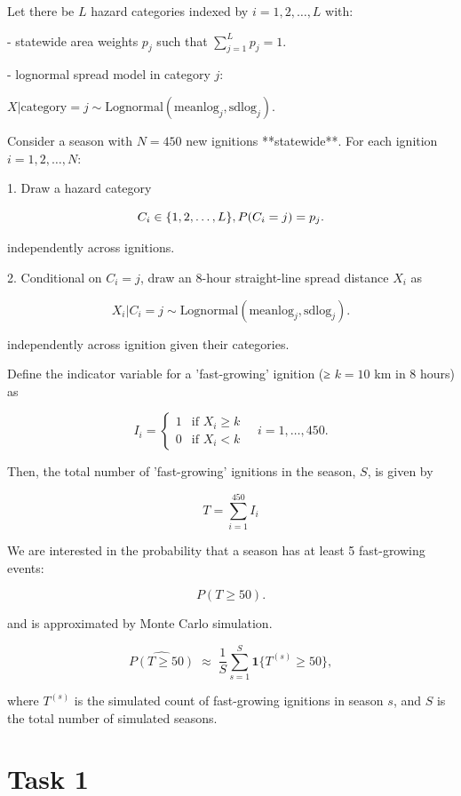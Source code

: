\documentclass[
  12pt,
]{scrreprt}
\begin{document}
\begin{customtextbox}

Let there be $L$ hazard categories indexed by $i = 1, 2, \ldots, L$ with:

- statewide area weights $p_j$ such that $\sum_{j=1}^{L} p_j = 1$.

- lognormal spread model in category $j$: 

$ X | \text{category} = j \sim \text{Lognormal}(\text{meanlog}_j, \text{sdlog}_j). $

Consider a season with $N = 450$ new ignitions **statewide**. For each ignition $i = 1, 2, \ldots, N$:

1. Draw a hazard category 

$$ C_i \in \{1, 2, \ldots, L\}, \space \space P(C_i = j) = p_j. $$

independently across ignitions.

2. Conditional on $C_i = j$, draw an 8-hour straight-line spread distance $X_i$ as

$$ X_i | C_i = j \sim \text{Lognormal}(\text{meanlog}_j, \text{sdlog}_j). $$

independently across ignition given their categories.

Define the indicator variable for a 'fast-growing' ignition (≥ $k = 10$ km in 8 hours) as

$$ I_i = \begin{cases} 1 & \text{if } X_i \geq k \\ 0 & \text{if } X_i < k \end{cases} \quad i = 1,\dots,450.$$

Then, the total number of 'fast-growing' ignitions in the season, $S$, is given by

$$ T = \sum_{i=1}^{450} I_i $$

We are interested in the probability that a season has at least 5 fast-growing events:

$$ P(T \geq 50). $$

and is approximated by Monte Carlo simulation.

$$
\widehat{P(T \ge 50)}
\;\approx\;
\frac{1}{S} \sum_{s=1}^{S} \mathbf{1}\{T^{(s)} \ge 50\},
$$

where $T^{(s)}$ is the simulated count of fast-growing ignitions in season $s$, and $S$ is the total number of simulated seasons.

\end{customtextbox}

\section{Task 1}\label{task-1-2}
\end{document}

